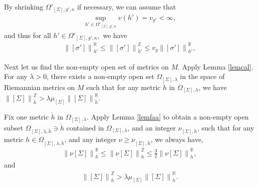 \documentclass[11pt,a4paper]{amsart}
\numberwithin{equation}{section}
\newcommand{\lam}{\lambda}
\newcommand{\Om}{\Omega}
\newcommand{\si}{\sigma}
\newcommand{\Si}{\Sigma}
\newcommand{\nog}[1]{\no{#1}^{\R}}
\newcommand{\no}[1]{\left\lVert#1\right\rVert}
\newcommand{\ka}{\kappa}
\newcommand{\R}{\mathbb{R}}
\newcommand{\Z}{\mathbb{Z}}
\theoremstyle{plain}
\theoremstyle{definition}
\numberwithin{equation}{subsection}
\begin{document}
	By shrinking $\Om'_{[\Si],g',\ka}$ if necessary, we can assume that 
	\begin{align*}
		\sup_{h'\in \Om'_{[\Si],g',\ka}}v(h')=v_{g'}<\infty,
	\end{align*}
	and thus for all $h'\in\Om'_{[\Si],g',\ka},$ we have
		\begin{align}\label{eqrv}
		\no{[\si']}_{h'}^{\R}\le \no{[\si']}_{h'}^{\Z}\le v_{g
		}\no{[\si']}_{h'}^{\R},	
	\end{align}
	
	Next let us find the non-empty open set of metrics on $M$.	Apply Lemma \ref{lemcal}. For any $\lam>0$, there exists a non-empty open set $\Om_{[\Si],\lam}$ in the space of Riemannian metrics on $M$ such that for any metric $\check{h}$ in $ \Om_{[\Si],\lam}$, we have $			\no{[\Si]}_{\check{h}}^{\Z}>\lam\mu_{[\Si]}\nog{[\Si]}_{\check{h}}.$ 
	
	Fix one metric $\check{h}$ in $\Om_{[\Si],\lam}$. Apply Lemma \ref{lemfaa} to obtain a non-empty open subset $\Om_{[\Si],\lam,\check{h}}\ni \check{h}$ contained in $ \Om_{[\Si],\lam}$, and an integer $\nu_{[\Si],\check{h}}$, such that for any metric $h\in\Om_{[\Si],\lam,\check{h}}$, and any integer $\nu\ge \nu_{[\Si],\check{h}}$, we always have,
	\begin{align}\label{eqn3}
		\no{\nu[\Si]}_h^{\R}\le \no{\nu[\Si]}^{\Z}_h\le \frac{3}{2}\no{\nu[\Si]}_h^{\R},
	\end{align}
	and 
	\begin{align}\label{eqlm}
		\no{[\Si]}^{\Z}_h> \lam\mu_{[\Si]}\no{[\Si]}_h^{\R}.
	\end{align}
	
\end{document}
